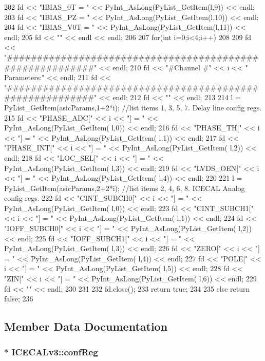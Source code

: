\begin{DoxyCode}
{{202         fd <<   "IBIAS_0T    = " << PyInt_AsLong(PyList_GetItem(l,9)) << endl;
203         fd <<   "IBIAS_PZ    = " << PyInt_AsLong(PyList_GetItem(l,10)) << endl;
204         fd <<   "IBIAS_V0T   = " << PyInt_AsLong(PyList_GetItem(l,11)) << endl;
205         fd << "" << endl << endl;
206 
207         for(int i=0;i<4;i++)
208         {
209             fd << "#########################################################" << 
      endl;
210             fd << "#Channel #" << i << " Parameters:" << endl;
211             fd << "#########################################################" << 
      endl;
212             fd << "" << endl;
213 
214             l = PyList_GetItem(asicParams,1+2*i);       //list items 1, 3, 5, 7. 
      Delay line config regs.
215             fd <<   "PHASE_ADC[" << i << "]   = " << PyInt_AsLong(PyList_GetItem(
      l,0)) << endl;
216             fd <<   "PHASE_TH[" << i << "]    = " << PyInt_AsLong(PyList_GetItem(
      l,1)) << endl;
217             fd <<   "PHASE_INT[" << i << "]   = " << PyInt_AsLong(PyList_GetItem(
      l,2)) << endl;
218             fd <<   "LOC_SEL[" << i << "]     = " << PyInt_AsLong(PyList_GetItem(
      l,3)) << endl;
219             fd <<   "LVDS_OEN[" << i << "]    = " << PyInt_AsLong(PyList_GetItem(
      l,4)) << endl;
220 
221             l = PyList_GetItem(asicParams,2+2*i);       //list items 2, 4, 6, 8. 
      ICECAL Analog config regs.
222             fd <<   "CINT_SUBCH0[" << i << "] = " << PyInt_AsLong(PyList_GetItem(
      l,0)) << endl;
223             fd <<   "CINT_SUBCH1[" << i << "] = " << PyInt_AsLong(PyList_GetItem(
      l,1)) << endl;
224             fd <<   "IOFF_SUBCH0[" << i << "] = " << PyInt_AsLong(PyList_GetItem(
      l,2)) << endl;
225             fd <<   "IOFF_SUBCH1[" << i << "] = " << PyInt_AsLong(PyList_GetItem(
      l,3)) << endl;
226             fd <<   "ZERO[" << i << "]        = " << PyInt_AsLong(PyList_GetItem(
      l,4)) << endl;
227             fd <<   "POLE[" << i << "]        = " << PyInt_AsLong(PyList_GetItem(
      l,5)) << endl;
228             fd <<   "ZIN[" << i << "]         = " << PyInt_AsLong(PyList_GetItem(
      l,6)) << endl;  
229             fd << "" << endl;
230         }
231 
232         fd.close();
233         return true;
234     }
235     else return false;
236 }
\end{DoxyCode}


\subsection{Member Data Documentation}
\hypertarget{classICECALv3_a6e8b6c03f5b0f1d8281bf8a0fa46064f}{
\subsubsection[{confReg}]{$\ast$ {\bf ICECALv3::confReg}}}
\label{classICECALv3_a6e8b6c03f5b0f1d8281bf8a0fa46064f}


